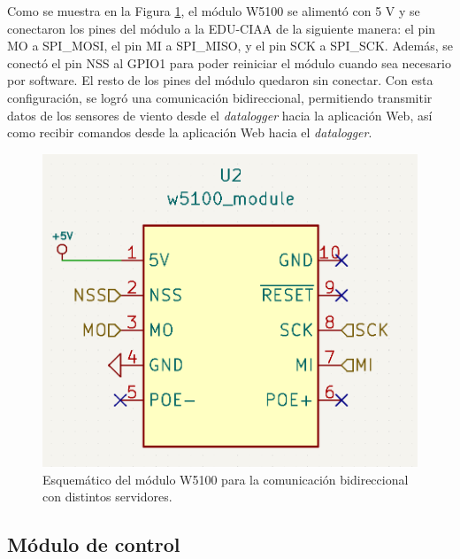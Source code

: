 Como se muestra en la Figura \ref{fig:esquemEthernet}, el módulo W5100 se alimentó con 5 \unit{\volt} y se conectaron los pines del módulo a la EDU-CIAA de la siguiente manera: el pin MO a SPI\_MOSI, el pin MI a SPI\_MISO, y el pin SCK a SPI\_SCK. Además, se conectó el pin NSS al GPIO1 para poder reiniciar el módulo cuando sea necesario por software. El resto de los pines del módulo quedaron sin conectar. Con esta configuración, se logró una comunicación bidireccional, permitiendo transmitir datos de los sensores de viento desde el \textit{datalogger} hacia la aplicación Web, así como recibir comandos desde la aplicación Web hacia el \textit{datalogger}.
\begin{figure}[H]
    \centering
    \includegraphics[width=0.5\linewidth]{Figuras/datalogger/Hardware/esquemEthernet.png}
    \caption{Esquemático del módulo W5100 para la comunicación bidireccional con distintos servidores.}
    \label{fig:esquemEthernet}
\end{figure}


\subsection{Módulo de control}\label{sec:circuitoPWM}



